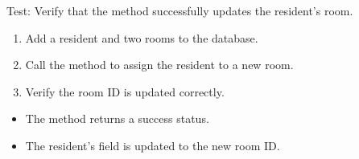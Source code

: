 \documentclass[letterpaper,10pt,english]{sphinxmanual}
\begin{document}
\begin{fulllineitems}
\label{\detokenize{test:test.test_residetnt.test_update_resident_room_success}}
\pysigstartsignatures
\pysiglinewithargsret
{}
{}
{}
\pysigstopsignatures
\sphinxAtStartPar
Test: Verify that the method successfully updates the resident’s room.
\begin{description}
\begin{enumerate}
%
\item {} 
\sphinxAtStartPar
Add a resident and two rooms to the database.

\item {} 
\sphinxAtStartPar
Call the  method to assign the resident to a new room.

\item {} 
\sphinxAtStartPar
Verify the room ID is updated correctly.

\end{enumerate}

\begin{itemize}
\item {} 
\sphinxAtStartPar
The method returns a success status.

\item {} 
\sphinxAtStartPar
The resident’s  field is updated to the new room ID.

\end{itemize}

\end{description}

\end{fulllineitems}

\end{document}
